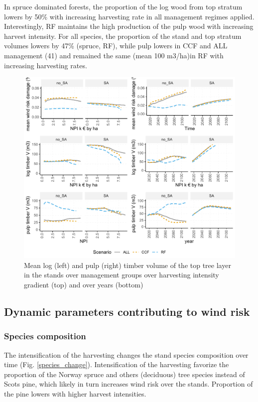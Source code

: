 \documentclass[]{elsarticle} %
\makeatletter
\def\maxwidth{\ifdim\Gin@nat@width>\linewidth\linewidth
\else\Gin@nat@width\fi}
\let\Oldincludegraphics\includegraphics
\renewcommand{\includegraphics}[1]{\Oldincludegraphics[width=\maxwidth]{#1}}
\makeatother
\begin{document}
In spruce dominated forests, the proportion of the log wood from top
stratum lowers by 50\% with increasing harvesting rate in all management
regimes applied. Interestingly, RF maintains the high production of the
pulp wood with increasing harvest intensity. For all species, the
proportion of the stand and top stratum volumes lowers by 47\% (spruce,
RF), while pulp lowers in CCF and ALL management (41) and remained the
same (mean 100 m3/ha)in RF with increasing harvesting rates.

\begin{figure}
\centering
\includegraphics{test_manus2_files/figure-latex/show-plot-volume-1.pdf}
\caption{\label{fig:show-plot-volume}Mean log (left) and pulp (right) timber
volume of the top tree layer in the stands over management groups over
harvesting intensity gradient (top) and over years (bottom)}
\end{figure}

\subsection{Dynamic parameters contributing to wind
risk}\label{dynamic-parameters-contributing-to-wind-risk}

\subsubsection{Species composition}\label{species-composition}

The intensification of the harvesting changes the stand species
composition over time (Fig. \ref{species_change}). Intensification of
the harvesting favorize the proportion of the Norway spruce and others
(deciduous) tree species instead of Scots pine, which likely in turn
increases wind risk over the stands. Proportion of the pine lowers with
higher harvest intensities.
\end{document}
